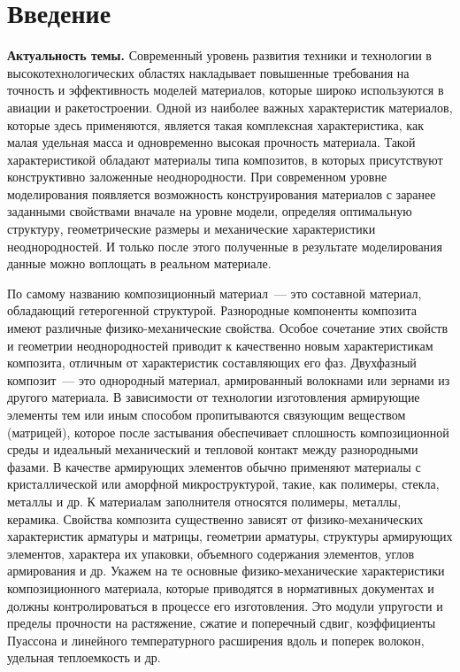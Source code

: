 
\setcounter{secnumdepth}{-1}
\chapter{Введение}
\setcounter{secnumdepth}{2}

{\bf Актуальность темы.} Современный уровень развития техники и технологии в высокотехнологических областях накладывает повышенные требования на точность и эффективность моделей материалов, которые широко используются в авиации и ракетостроении. Одной из наиболее важных характеристик материалов, которые здесь применяются, является такая комплексная характеристика, как малая удельная масса и одновременно высокая прочность материала. Такой характеристикой обладают материалы типа композитов, в которых присутствуют конструктивно заложенные неоднородности. При современном уровне моделирования появляется возможность конструирования материалов с заранее заданными свойствами вначале на уровне модели, определяя оптимальную структуру, геометрические размеры и механические характеристики неоднородностей. И только после этого полученные в результате моделирования данные можно воплощать в реальном материале.

По самому названию композиционный материал~--- это составной материал, обладающий гетерогенной структурой. Разнородные компоненты композита имеют различные физико-механические свойства. Особое сочетание этих свойств и геометрии неоднородностей приводит к качественно новым характеристикам композита, отличным от характеристик составляющих его фаз. Двухфазный композит~--- это однородный материал, армированный волокнами или зернами из другого материала. В зависимости от технологии изготовления армирующие элементы тем или иным способом пропитываются связующим веществом (матрицей), которое после застывания обеспечивает сплошность композиционной среды и идеальный механический и тепловой контакт между разнородными фазами. В качестве армирующих элементов обычно применяют материалы с кристаллической или аморфной микроструктурой, такие, как полимеры, стекла, металлы и др. К материалам заполнителя относятся полимеры, металлы, керамика. Свойства композита существенно зависят от физико-механических характеристик арматуры и матрицы, геометрии арматуры, структуры армирующих элементов, характера их упаковки, объемного содержания элементов, углов армирования и др. Укажем на те основные физико-механические характеристики композиционного материала, которые приводятся в нормативных документах и должны контролироваться в процессе его изготовления. Это модули упругости и пределы прочности на растяжение, сжатие и поперечный сдвиг, коэффициенты Пуассона и линейного температурного расширения вдоль и поперек волокон, удельная теплоемкость и др.{\sloppy\par}


